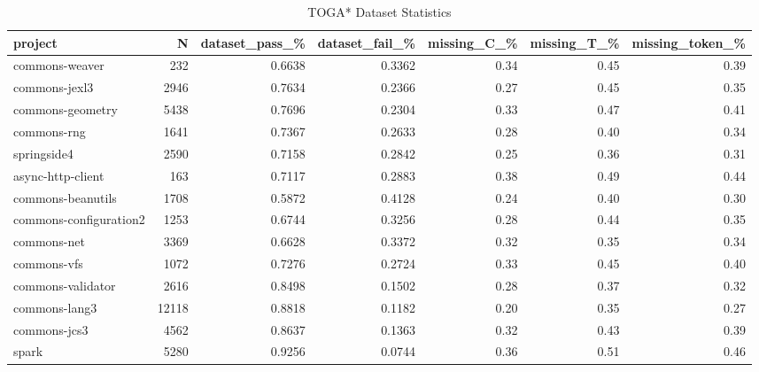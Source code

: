 \begin{table*}
\centering
\caption{TOGA* Dataset Statistics}
\label{tab:toga_stats_all}
\begin{tabular}{lrrrrrr}
\toprule
                project &       N &  dataset\_pass\_\% &  dataset\_fail\_\% &  missing\_C\_\% &  missing\_T\_\% &  missing\_token\_\% \\
\midrule
         commons-weaver &     232 &          0.6638 &          0.3362 &         0.34 &         0.45 &             0.39 \\
          commons-jexl3 &    2946 &          0.7634 &          0.2366 &         0.27 &         0.45 &             0.35 \\
       commons-geometry &    5438 &          0.7696 &          0.2304 &         0.33 &         0.47 &             0.41 \\
            commons-rng &    1641 &          0.7367 &          0.2633 &         0.28 &         0.40 &             0.34 \\
            springside4 &    2590 &          0.7158 &          0.2842 &         0.25 &         0.36 &             0.31 \\
      async-http-client &     163 &          0.7117 &          0.2883 &         0.38 &         0.49 &             0.44 \\
      commons-beanutils &    1708 &          0.5872 &          0.4128 &         0.24 &         0.40 &             0.30 \\
 commons-configuration2 &    1253 &          0.6744 &          0.3256 &         0.28 &         0.44 &             0.35 \\
            commons-net &    3369 &          0.6628 &          0.3372 &         0.32 &         0.35 &             0.34 \\
            commons-vfs &    1072 &          0.7276 &          0.2724 &         0.33 &         0.45 &             0.40 \\
      commons-validator &    2616 &          0.8498 &          0.1502 &         0.28 &         0.37 &             0.32 \\
          commons-lang3 &   12118 &          0.8818 &          0.1182 &         0.20 &         0.35 &             0.27 \\
           commons-jcs3 &    4562 &          0.8637 &          0.1363 &         0.32 &         0.43 &             0.39 \\
                  spark &    5280 &          0.9256 &          0.0744 &         0.36 &         0.51 &             0.46 \\

\end{tabular}
\end{table*}
